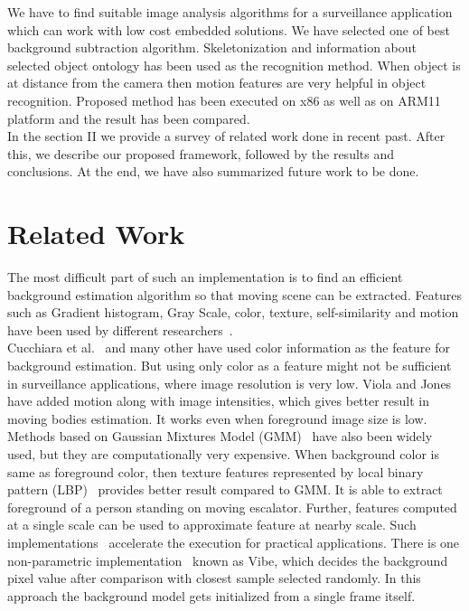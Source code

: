\documentclass[conference]{IEEEtran}
\begin{document}
\indent We have to find suitable image analysis algorithms for a
surveillance application which can work with low cost embedded solutions.
We have selected one of best~\cite{5} background subtraction algorithm.
Skeletonization and information about selected object ontology
has been used as the recognition method. When object is at distance from
the camera then motion features are very helpful in object recognition.
Proposed method has been executed on x86 as well as on ARM11 platform
and the result has been compared. \\
\indent In the  section II we provide a survey of related work done in
recent past. After this, we describe our proposed framework, followed by
the results and conclusions.  At the end, we have also summarized future
work to be done.


\section{Related Work}
The most difficult part of such an implementation is to find an
efficient background estimation algorithm so that moving scene can be
extracted. Features such as Gradient histogram, Gray Scale,
color, texture, self-similarity and motion have been used by different
researchers~\cite{3, 5, 1, 6, 13}. \\
\indent Cucchiara et al.~\cite{1} and many other have used color
information as the feature for background estimation. But using only
color as a feature might not be sufficient in surveillance applications,
where image resolution is very low. Viola and Jones~\cite{2} have added
motion along with image intensities, which gives better result in moving
bodies estimation. It works even when foreground image size is low.
Methods based on Gaussian Mixtures Model (GMM)~\cite{15} have also been
widely used, but they are computationally very expensive.  When
background color is same as foreground color, then texture features
represented by local binary pattern (LBP)~\cite{3} provides better
result compared to GMM. It is able to extract foreground of a person
standing on moving escalator. Further, features computed at a single
scale can be used to approximate feature at nearby scale. Such
implementations~\cite{4} accelerate the execution for practical
applications. There is one non-parametric implementation~\cite{5} known
as Vibe, which decides the background pixel value after comparison with
closest sample selected randomly. In this approach the background model
gets initialized from a single frame itself.\\
\end{document}
